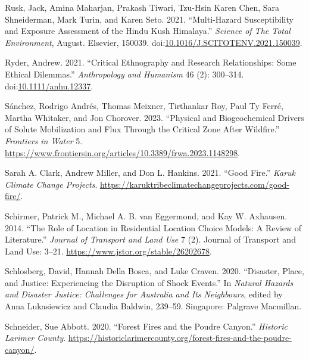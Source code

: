 \documentclass[
]{article}
\newlength{\cslhangindent}
\newenvironment{CSLReferences}[2] %
 {\begin{list}{}{%
  \setlength{\itemindent}{0pt}
  \setlength{\leftmargin}{0pt}
  \setlength{\parsep}{0pt}
  \ifodd #1
   \setlength{\leftmargin}{\cslhangindent}
   \setlength{\itemindent}{-1\cslhangindent}
  \fi
  \setlength{\itemsep}{#2\baselineskip}}}
 {\end{list}}
\begin{document}
\begin{CSLReferences}{1}{0}
Rusk, Jack, Amina Maharjan, Prakash Tiwari, Tzu-Hsin Karen Chen, Sara Shneiderman, Mark Turin, and Karen Seto. 2021. {``Multi-Hazard Susceptibility and Exposure Assessment of the {Hindu Kush Himalaya}.''} \emph{Science of The Total Environment}, August. Elsevier, 150039. doi:\href{https://doi.org/10.1016/J.SCITOTENV.2021.150039}{10.1016/J.SCITOTENV.2021.150039}.

Ryder, Andrew. 2021. {``Critical {Ethnography} and {Research Relationships}: {Some Ethical Dilemmas}.''} \emph{Anthropology and Humanism} 46 (2): 300--314. doi:\href{https://doi.org/10.1111/anhu.12337}{10.1111/anhu.12337}.

Sánchez, Rodrigo Andrés, Thomas Meixner, Tirthankar Roy, Paul Ty Ferré, Martha Whitaker, and Jon Chorover. 2023. {``Physical and Biogeochemical Drivers of Solute Mobilization and Flux Through the Critical Zone After Wildfire.''} \emph{Frontiers in Water} 5. \url{https://www.frontiersin.org/articles/10.3389/frwa.2023.1148298}.

Sarah A. Clark, Andrew Miller, and Don L. Hankins. 2021. {``Good {Fire}.''} \emph{Karuk Climate Change Projects}. \url{https://karuktribeclimatechangeprojects.com/good-fire/}.

Schirmer, Patrick M., Michael A. B. van Eggermond, and Kay W. Axhausen. 2014. {``The Role of Location in Residential Location Choice Models: A Review of Literature.''} \emph{Journal of Transport and Land Use} 7 (2). {Journal of Transport and Land Use}: 3--21. \url{https://www.jstor.org/stable/26202678}.

Schlosberg, David, Hannah Della Bosca, and Luke Craven. 2020. {``Disaster, {Place}, and {Justice}: {Experiencing} the {Disruption} of {Shock Events}.''} In \emph{Natural {Hazards} and {Disaster Justice}: {Challenges} for {Australia} and {Its Neighbours}}, edited by Anna Lukasiewicz and Claudia Baldwin, 239--59. Singapore: Palgrave Macmillan.

Schneider, Sue Abbott. 2020. {``Forest {Fires} and the {Poudre Canyon}.''} \emph{Historic Larimer County}. \url{https://historiclarimercounty.org/forest-fires-and-the-poudre-canyon/}.


\end{CSLReferences}
\end{document}
